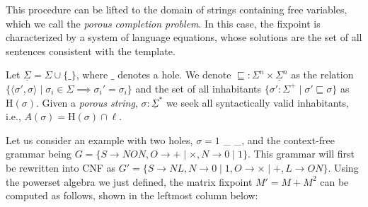 \documentclass[sigplan,review,acmsmall,nonacm,anonymous]{acmart}\settopmatter{printfolios=false,printccs=false,printacmref=false}
\begin{document}
  This procedure can be lifted to the domain of strings containing free variables, which we call the \textit{porous completion problem}. In this case, the fixpoint is characterized by a system of language equations, whose solutions are the set of all sentences consistent with the template.

  \begin{definition}
    Let $\underline\Sigma = \Sigma \cup \{\_\}$, where $\_$ denotes a hole. We denote $\sqsubseteq: \Sigma^n \times \underline\Sigma^n$ as the relation $\{\langle\sigma', \sigma\rangle \mid \sigma_i \in \Sigma \implies \sigma_i' = \sigma_i\}$ and the set of all inhabitants $\{\sigma': \Sigma^+ \mid \sigma' \sqsubseteq \sigma\}$ as $\text{H}(\sigma)$. Given a \textit{porous string}, $\sigma: \underline\Sigma^*$ we seek all syntactically valid inhabitants, i.e., $A(\sigma)=\text{H}(\sigma)\cap\ell$.
  \end{definition}

  Let us consider an example with two holes, $\sigma = 1$ \_ \_, and the context-free grammar being $G=\{S\rightarrow N O N, O \rightarrow + \mid \times, N \rightarrow 0 \mid 1\}$. This grammar will first be rewritten into CNF as $G'= \{S \rightarrow N L, N \rightarrow 0 \mid 1, O \rightarrow \times \mid +, L \rightarrow O N\}$. Using the powerset algebra we just defined, the matrix fixpoint $M' = M + M^2$ can be computed as follows, shown in the leftmost column below:
\end{document}
